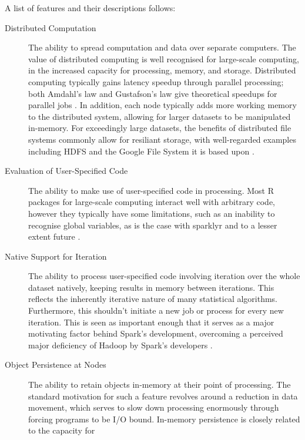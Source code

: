 \documentclass[a4paper,10pt]{article}
\begin{document}
A list of features and their descriptions follows:

\begin{description}
\item[Distributed Computation]
      The ability to spread computation and data over separate computers.
      The value of distributed computing is well recognised for
      large-scale computing, in the increased capacity for
      processing, memory, and storage.
      Distributed computing typically gains latency speedup through
      parallel processing; both Amdahl's law and Gustafson's law give
      theoretical speedups for parallel jobs \cite{amdahl1967law}
      \cite{gustafson1988law}.
      In addition, each node typically adds more working memory to
      the distributed system, allowing for larger datasets to be
      manipulated in-memory.
      For exceedingly large datasets, the benefits of distributed
      file systems commonly allow for resiliant storage, with
      well-regarded examples including HDFS and the Google File
      System it is based upon \cite{shvachko2010hadoop}
      \cite{ghemawat2003google}.
\item[Evaluation of User-Specified Code]
      The ability to make use of user-specified code in processing.
	Most R packages for large-scale computing interact well with
	arbitrary code, however they typically have some limitations,
	such as an inability to recognise global variables, as is the
	case with sparklyr and to a lesser extent future
      \cite{sparklyr2020limitations} \cite{microsoft20}.
\item[Native Support for Iteration]
      The ability to process user-specified code involving iteration
      over the whole dataset natively, keeping results in
      memory between iterations.
      This reflects the inherently iterative nature of many
      statistical algorithms.
      Furthermore, this shouldn't initiate a new job or process for
      every new iteration.
      This is seen as important enough that it serves as a major
	motivating factor behind Spark's development, overcoming a
	perceived major deficiency of Hadoop by Spark's developers
	\cite{zaharia2010spark}.
\item[Object Persistence at Nodes]
      The ability to retain objects in-memory at their point of
      processing.
      The standard motivation for such a feature revolves around a
      reduction in data movement, which serves to slow down
      processing enormously through forcing programs to be I/O bound.
      In-memory persistence is closely related to the capacity for

\end{description}
\end{document}
